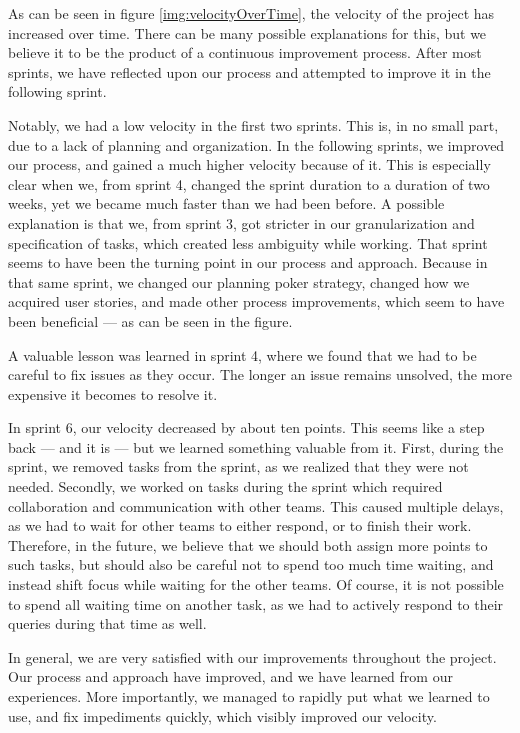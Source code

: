 As can be seen in figure \ref{img:velocityOverTime}, the velocity of the project has increased over time.
There can be many possible explanations for this, but we believe it to be the product of a continuous improvement process.
After most sprints, we have reflected upon our process and attempted to improve it in the following sprint.

Notably, we had a low velocity in the first two sprints. This is, in no small part, due to a lack of planning and organization. In the following sprints, we improved our process, and gained a much higher velocity because of it.
This is especially clear when we, from sprint 4, changed the sprint duration to a duration of two weeks, yet we became much faster than we had been before.
A possible explanation is that we, from sprint 3, got stricter in our granularization and specification of tasks, which created less ambiguity while working.
That sprint seems to have been the turning point in our process and approach. Because in that same sprint, we changed our planning poker strategy, changed how we acquired user stories, and made other process improvements, which seem to have been beneficial --- as can be seen in the figure.

A valuable lesson was learned in sprint 4, where we found that we had to be careful to fix issues as they occur. The longer an issue remains unsolved, the more expensive it becomes to resolve it.

In sprint 6, our velocity decreased by about ten points. This seems like a step back --- and it is --- but we learned something valuable from it.
First, during the sprint, we removed tasks from the sprint, as we realized that they were not needed. 
Secondly, we worked on tasks during the sprint which required collaboration and communication with other teams. This caused multiple delays, as we had to wait for other teams to either respond, or to finish their work. Therefore, in the future, we believe that we should both assign more points to such tasks, but should also be careful not to spend too much time waiting, and instead shift focus while waiting for the other teams. Of course, it is not possible to spend all waiting time on another task, as we had to actively respond to their queries during that time as well.

In general, we are very satisfied with our improvements throughout the project. Our process and approach have improved, and we have learned from our experiences. More importantly, we managed to rapidly put what we learned to use, and fix impediments quickly, which visibly improved our velocity.


